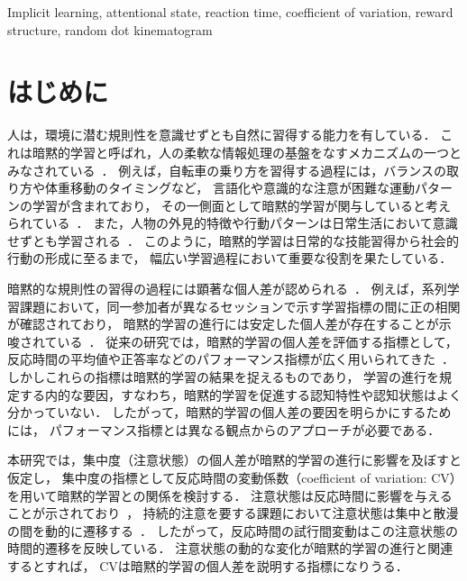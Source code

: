 \begin{ekeyword}
Implicit learning, attentional state, reaction time, coefficient of variation, reward structure, random dot kinematogram
\end{ekeyword}
\maketitle


\section{はじめに}
人は，環境に潜む規則性を意識せずとも自然に習得する能力を有している．
これは暗黙的学習と呼ばれ，人の柔軟な情報処理の基盤をなすメカニズムの一つとみなされている~\cite{cleeremans1998implicit,frensch2003implicit,maresch2021measures,costea2023implicit}．
例えば，自転車の乗り方を習得する過程には，バランスの取り方や体重移動のタイミングなど，
言語化や意識的な注意が困難な運動パターンの学習が含まれており，
その一側面として暗黙的学習が関与していると考えられている~\cite{maresch2021measures}．
また，人物の外見的特徴や行動パターンは日常生活において意識せずとも学習される~\cite{costea2023implicit}．
このように，暗黙的学習は日常的な技能習得から社会的行動の形成に至るまで，
幅広い学習過程において重要な役割を果たしている．

暗黙的な規則性の習得の過程には顕著な個人差が認められる~\cite{kalra2019evidence}．
例えば，系列学習課題において，同一参加者が異なるセッションで示す学習指標の間に正の相関が確認されており，
暗黙的学習の進行には安定した個人差が存在することが示唆されている~\cite{kalra2019evidence}．
従来の研究では，暗黙的学習の個人差を評価する指標として，
反応時間の平均値や正答率などのパフォーマンス指標が広く用いられてきた~\cite{perruchet2006implicit}．
しかしこれらの指標は暗黙的学習の結果を捉えるものであり，
学習の進行を規定する内的な要因，すなわち，暗黙的学習を促進する認知特性や認知状態はよく分かっていない．
したがって，暗黙的学習の個人差の要因を明らかにするためには，
パフォーマンス指標とは異なる観点からのアプローチが必要である．

本研究では，集中度（注意状態）の個人差が暗黙的学習の進行に影響を及ぼすと仮定し，
集中度の指標として反応時間の変動係数（coefficient of variation: CV）を用いて暗黙的学習との関係を検討する．
注意状態は反応時間に影響を与えることが示されており~\cite{savazzi2002speeding}，
持続的注意を要する課題において注意状態は集中と散漫の間を動的に遷移する~\cite{simor2025mind}．
したがって，反応時間の試行間変動はこの注意状態の時間的遷移を反映している．
注意状態の動的な変化が暗黙的学習の進行と関連するとすれば，
CVは暗黙的学習の個人差を説明する指標になりうる．

